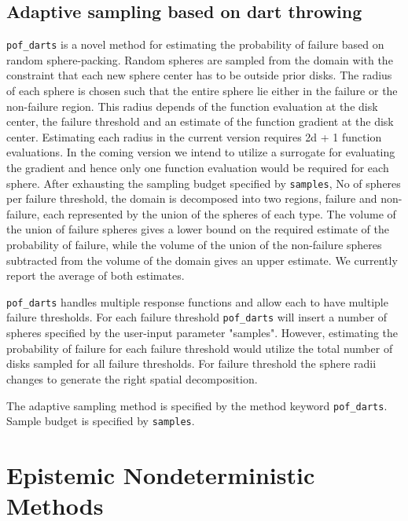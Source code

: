 \subsection{Adaptive sampling based on dart throwing}\label{uq:adaptive:darts}
\texttt{pof\_darts} is a novel method for estimating the probability of failure based on random sphere-packing. Random spheres are sampled from the domain with the constraint that each new sphere center has to be outside prior disks. The radius of each sphere is chosen such that the entire sphere lie either in the failure or the non-failure region. This radius depends of the function evaluation at the disk center, the failure threshold and an estimate of the function gradient at the disk center. Estimating each radius in the current version requires 2d + 1 function evaluations. In the coming version we intend to utilize a surrogate for evaluating the gradient and hence only one function evaluation would be required for each sphere. After exhausting the sampling budget specified by \texttt{samples}, No of spheres per failure threshold, the domain is decomposed into two regions, failure and non-failure, each represented by the union of the spheres of each type. The volume of the union of failure spheres gives a lower bound on the required estimate of the probability of failure, while the volume of the union of the non-failure spheres subtracted from the volume of the domain gives an upper estimate. We currently report the average of both estimates. 

\texttt{pof\_darts} handles multiple response functions and allow each to have multiple failure thresholds. For each failure threshold \texttt{pof\_darts} will insert a number of spheres specified by the user-input parameter "samples". However, estimating the probability of failure for each failure threshold would utilize the total number of disks sampled for all failure thresholds. For failure threshold the sphere radii changes to generate the right spatial decomposition.

The adaptive sampling method is specified by the method keyword 
\texttt{pof\_darts}. Sample budget is specified by \texttt{samples}.

\section{Epistemic Nondeterministic Methods}\label{uq:epistemic}

